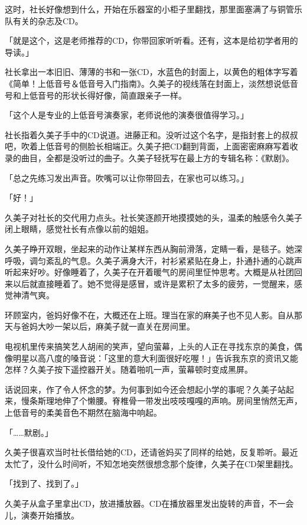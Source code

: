 \documentclass[UTF8]{ctexart}
\begin{document}
    这时，社长好像想到什么，开始在乐器室的小柜子里翻找，那里面塞满了与铜管乐队有关的杂志及CD。 

    「就是这个，这是老师推荐的CD，你带回家听听看。还有，这本是给初学者用的导读。」 

    社长拿出一本旧旧、薄薄的书和一张CD，水蓝色的封面上，以黄色的粗体字写着《简单！上低音号＆低音号入门指南》。久美子的视线落在封面上，淡然想说低音号和上低音号的形状长得好像，简直跟亲子一样。 

    「这个人是专业的上低音号演奏家，老师说他的演奏很值得学习。」 

    社长指着久美子手中的CD说道。进藤正和。没听过这个名字，是指封套上的叔叔吧，吹着上低音号的侧脸长相端正。久美子把CD翻到背面，上面密密麻麻写着收录的曲目，全都是没听过的曲子。久美子轻抚写在最上方的专辑名称：《默剧》。 

    「总之先练习发出声音。吹嘴可以让你带回去，在家也可以练习。」 

    「好！」 

    久美子对社长的交代用力点头。社长笑逐颜开地摸摸她的头，温柔的触感令久美子闭上眼睛，感觉社长有点像以前的姐姐。 

    久美子睁开双眼，坐起来的动作让某样东西从胸前滑落，定睛一看，是毯子。她深呼吸，调匀紊乱的气息。久美子满身大汗，衬衫紧紧贴在身上，扑通扑通的心跳声听起来好吵。好像睡着了，久美子在开着暖气的房间里怔忡思考。大概是从社团回来以后就直接睡着了。她不觉得是感冒，或许是累积了太多的疲劳，一觉醒来，感觉神清气爽。 

    环顾室内，爸妈好像不在，大概还在上班。理当在家的麻美子也不见人影。自从那天与爸妈大吵一架以后，麻美子就一直关在房间里。 

    电视机里传来搞笑艺人胡闹的笑声，望向萤幕，上头的人正在寻找东京的美食，偶像明星以高八度的嗓音说：「这里的意大利面很好吃喔！」告诉我东京的资讯又能怎样？久美子按下遥控器开关。随着啪叽一声，萤幕顿时变成黑屏。 

    话说回来，作了令人怀念的梦。为何事到如今还会想起小学的事呢？久美子站起来，慢条斯理地伸了个懒腰。脊椎骨一带发出吱吱嘎嘎的声响。房间里悄然无声，上低音号的柔美音色不期然在脑海中响起。 

    「……默剧。」 

    久美子很喜欢当时社长借给她的CD，还请爸妈买了同样的给她，反复聆听。最近太忙了，没什么时间听，不知怎地突然很想念那个旋律，久美子在CD架里翻找。 

    「找到了、找到了。」 

    久美子从盒子里拿出CD，放进播放器。CD在播放器里发出旋转的声音，不一会儿，演奏开始播放。 
\end{document}
